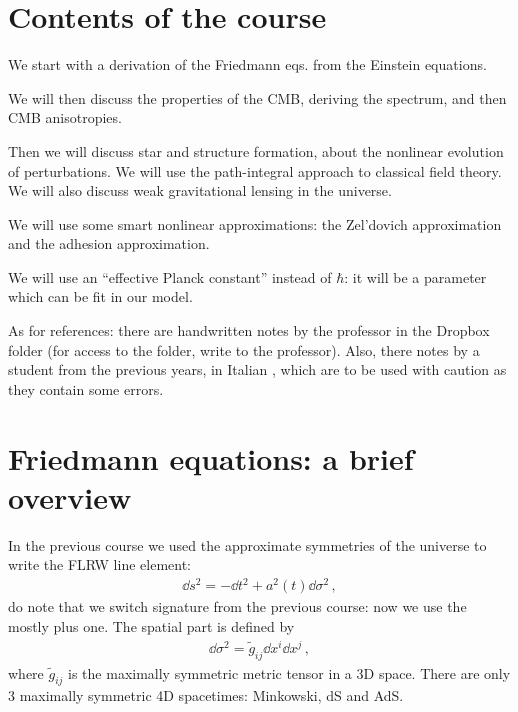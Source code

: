 \documentclass[main.tex]{subfiles}
\begin{document}
\section*{Contents of the course}

We start with a derivation of the Friedmann eqs. from the Einstein equations. 

We will then discuss the properties of the CMB, deriving the spectrum, and then CMB anisotropies. 

Then we will discuss star and structure formation, about the nonlinear evolution of perturbations. 
We will use the path-integral approach to classical field theory. 
We will also discuss weak gravitational lensing in the universe.

We will use some smart nonlinear approximations: the Zel'dovich approximation and the adhesion approximation.

We will use an ``effective Planck constant'' instead of \(\hbar\): it will be a parameter which can be fit in our model. 

As for references: there are handwritten notes by the professor in the Dropbox folder (for access to the folder, write to the professor).
Also, there notes by a student from the previous years, in Italian \cite{nataleNoteCorsoDi2017}, which are to be used with caution as they contain some errors. 

\section{Friedmann equations: a brief overview}


In the previous course we used the approximate symmetries of the universe to write the FLRW line element: 
%
\begin{align}
\dd{s^2} = -\dd{t^2} + a^2(t) \dd{\sigma^2}
\,,
\end{align}
%
do note that we switch signature from the previous course: now we use the mostly plus one.
The spatial part is defined by 
%
\begin{align}
\dd{\sigma^2} = \widetilde{g}_{ij} \dd{x^{i}} \dd{x^{j}}
\,,
\end{align}
%
where \(\widetilde{g}_{ij}\) is the maximally symmetric metric tensor in a 3D space. 
There are only 3 maximally symmetric 4D spacetimes: Minkowski, dS and AdS.
\end{document}
